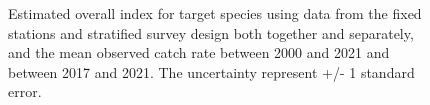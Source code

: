 \documentclass[12pt]{article}\usepackage[]{graphicx}\usepackage[]{color}
\begin{document}
\begin{figure}[htb]

{\centering {}  

}

\caption{Estimated overall index for target species using data from the fixed stations and stratified survey design both together and separately, and the mean observed catch rate between 2000 and 2021 and between 2017 and 2021. The uncertainty represent +/- 1 standard error.}\label{fig:target-indices}
\end{figure}
\end{document}
